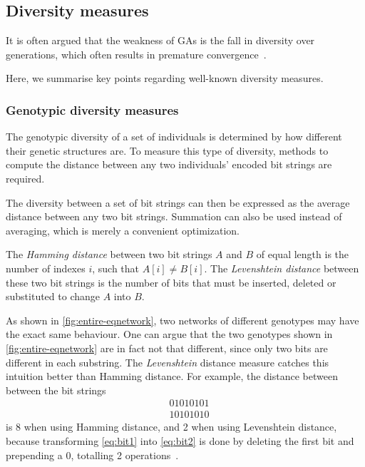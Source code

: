 \subsection{Diversity measures}
\label{sec:diversitymeasures}
It is often argued that the weakness of GAs is the fall in diversity over generations, which often results in premature convergence~\cite{diaz2007empirical, 1266373,Zitzler00comparisonof}.

Here, we summarise key points regarding well-known diversity measures. %

\subsubsection{Genotypic diversity measures}
The genotypic diversity of a set of individuals is determined by how different their genetic structures are. To measure this type of diversity, methods to compute the distance between any two individuals' encoded bit strings are required.

The diversity between a set of bit strings can then be expressed as the average distance between any two bit strings. Summation can also be used instead of averaging, which is merely a convenient optimization.

The \emph{Hamming distance} between two bit strings $A$ and $B$ of equal length is the number of indexes $i$, such that $A[i] \neq B[i]$. The \emph{Levenshtein distance} between these two bit strings is the number of bits that must be inserted, deleted or substituted to change $A$ into $B$.

As shown in \cref{fig:entire-eqnetwork}, two networks of different genotypes may have the exact same behaviour. One can argue that the two genotypes shown in \cref{fig:entire-eqnetwork} are in fact not that different, since only two bits are different in each substring. The \emph{Levenshtein} distance measure catches this intuition better than Hamming distance. For example, the distance between between the bit strings
%
\begin{align}
  &01010101\label{eq:bit1} \\
  &10101010\label{eq:bit2}
\end{align}
%
is 8 when using Hamming distance, and 2 when using Levenshtein distance, because transforming \cref{eq:bit1} into \cref{eq:bit2} is done by deleting the first bit and prepending a $0$, totalling 2 operations~\cite{1250187}.

